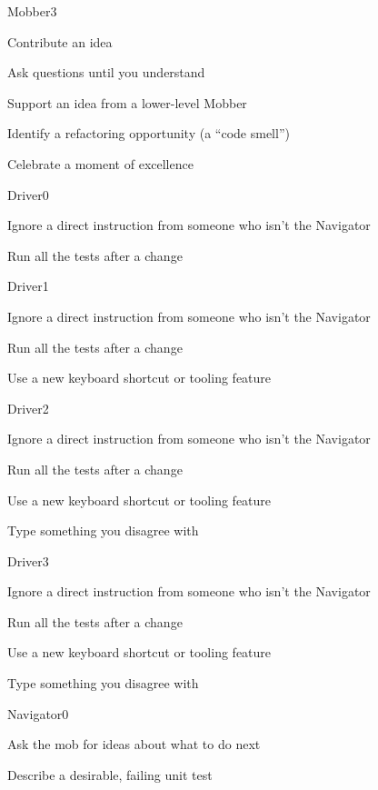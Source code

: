 \documentclass[20pt]{extarticle}
\begin{document}
\begin{role}{Mobber}{3}
  \item Contribute an idea
  \item Ask questions until you understand
  \item Support an idea from a lower-level Mobber
  \item Identify a refactoring opportunity (a ``code smell'')
  \item Celebrate a moment of excellence
\end{role}



\begin{role}{Driver}{0}
  \item Ignore a direct instruction from someone who isn't the Navigator
  \item Run all the tests after a change
\end{role}

\begin{role}{Driver}{1}
  \item Ignore a direct instruction from someone who isn't the Navigator
  \item Run all the tests after a change
  \item Use a new keyboard shortcut or tooling feature
\end{role}

\begin{role}{Driver}{2}
  \item Ignore a direct instruction from someone who isn't the Navigator
  \item Run all the tests after a change
  \item Use a new keyboard shortcut or tooling feature
  \item Type something you disagree with
\end{role}

\begin{role}{Driver}{3}
  \item Ignore a direct instruction from someone who isn't the Navigator
  \item Run all the tests after a change
  \item Use a new keyboard shortcut or tooling feature
  \item Type something you disagree with
\end{role}


\begin{role}{Navigator}{0}
  \item Ask the mob for ideas about what to do next
  \item Describe a desirable, failing unit test
\end{role}
\end{document}
